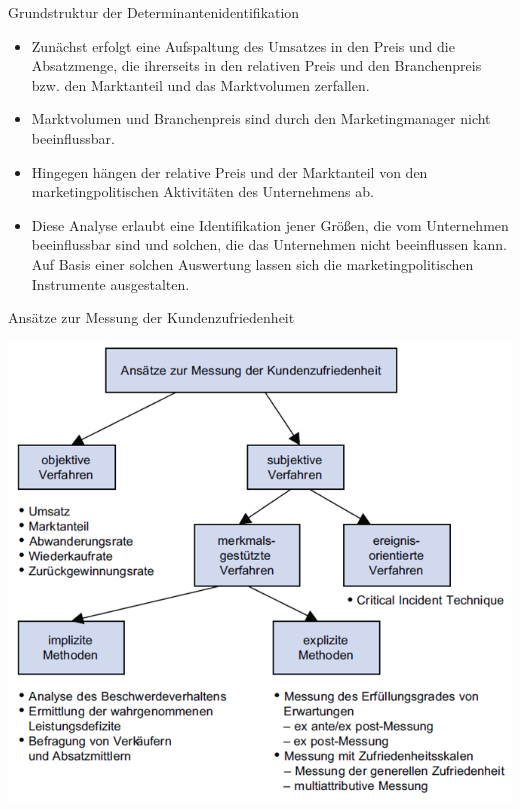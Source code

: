 \documentclass[12pt,ngerman,a4paper,ignorenonframetext,]{beamer}
\providecommand{\tightlist}{%
  \setlength{\itemsep}{0pt}\setlength{\parskip}{0pt}}
\begin{document}
\begin{frame}{Grundstruktur der Determinantenidentifikation}
\protect\hypertarget{grundstruktur-der-determinantenidentifikation}{}

\begin{itemize}
\tightlist
\item
  Zunächst erfolgt eine Aufspaltung des Umsatzes in den Preis und die
  Absatzmenge, die ihrerseits in den relativen Preis und den
  Branchenpreis bzw. den Marktanteil und das Marktvolumen zerfallen.
\item
  Marktvolumen und Branchenpreis sind durch den Marketingmanager nicht
  beeinflussbar.
\item
  Hingegen hängen der relative Preis und der Marktanteil von den
  marketingpolitischen Aktivitäten des Unternehmens ab.
\item
  Diese Analyse erlaubt eine Identifikation jener Größen, die vom
  Unternehmen beeinflussbar sind und solchen, die das Unternehmen nicht
  beeinflussen kann. Auf Basis einer solchen Auswertung lassen sich die
  marketingpolitischen Instrumente ausgestalten.
\end{itemize}

\end{frame}

\begin{frame}{Ansätze zur Messung der Kundenzufriedenheit}
\protect\hypertarget{ansatze-zur-messung-der-kundenzufriedenheit}{}

\begin{center}\includegraphics[width=0.7\linewidth]{./images/Marketingcontrolling/Zufriedenheit} \end{center}

\end{frame}
\end{document}

